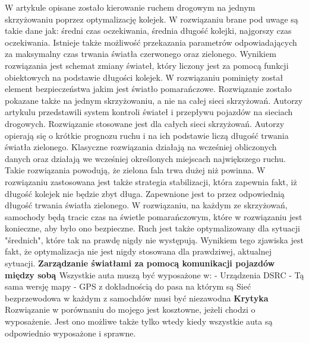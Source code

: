\newline
\indent
W artykule \cite{de1998optimal} opisane zostało kierowanie ruchem drogowym na jednym skrzyżowaniu poprzez optymalizację kolejek. W rozwiązaniu brane pod uwage są takie dane jak: średni czas oczekiwania, średnia długość kolejki, najgorszy czas oczekiwania. Istnieje także możliwość przekazania parametrów odpowiadających za maksymalny czas trwania światła czerwonego oraz zielonego. Wynikiem rozwiązania jest schemat zmiany świateł, który liczony jest za pomocą funkcji obiektowych na podstawie długości kolejek. W rozwiązaniu pominięty został element bezpieczeństwa jakim jest światło pomarańczowe. Rozwiązanie zostało pokazane także na jednym skrzyżowaniu, a nie na całej sieci skrzyżowań.
\newline
\indent
  Autorzy artykulu \cite{lammer2008self} przedstawili system kontroli świateł i przepływu pojazdów na sieciach drogowych. Rozwiązanie stosowane jest dla całych sieci skrzyżowań. Autorzy opierają się o krótkie prognozu ruchu i na ich podstawie liczą długość trwania światła zielonego. Klasyczne rozwiązania działają na wcześniej obliczonych danych oraz działają we wcześniej określonych miejscach największego ruchu. Takie rozwiązania powodują, że zielona fala trwa dużej niż powinna. W rozwiązaniu zastosowana jest także strategia stabilizacji, która zapewnia fakt, iż długość kolejek nie będzie zbyt długa. Zapewnione jest to przez odpowiednią długość trwania światła zielonego. W rozwiązaniu, na każdym ze skrzyżowań, samochody będą tracic czas na świetle pomarańczowym, które w rozwiązaniu jest konieczne, aby było ono bezpieczne. Ruch jest także optymalizowany dla sytuacji "średnich", które tak na prawdę nigdy nie występują. Wynikiem tego zjawiska jest fakt, że optymalizacja nie jest nigdy stosowana dla prawdziwej, aktualnej sytuacji.
\newline
\indent
\textbf{Zarządzanie światłami za pomocą komunikacji pojazdów między sobą \cite{ferreira2010self}}
\newline
Wszystkie auta muszą być wyposażone w:
\newline
	- Urządzenia DSRC
\newline
  - Tą sama wersję mapy
\newline
	- GPS z dokładnością do pasa na którym są
\newline
Sieć bezprzewodowa w każdym z samochdów musi być niezawodna
\newline
\newline
\textbf{Krytyka}
\newline
Rozwiązanie w porównaniu do mojego jest kosztowne, jeżeli chodzi o wyposażenie. Jest ono możliwe także tylko wtedy kiedy wszystkie auta są odpowiednio wyposażone i sprawne.
    
